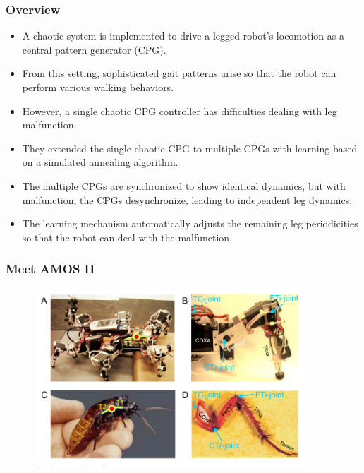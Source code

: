 \documentclass{beamer}
\begin{document}
\begin{frame}
\frametitle{Overview}
\begin{itemize}
\item A chaotic system is implemented to drive a legged robot's locomotion as a central pattern generator (CPG).
\item From this setting, sophisticated gait patterns arise so that the robot can perform various walking behaviors.
\item However, a single chaotic CPG controller has difficulties dealing with leg malfunction.
\item They extended the single chaotic CPG to multiple CPGs with learning based on a simulated annealing algorithm.
\item The multiple CPGs are synchronized to show identical dynamics, but with malfunction, the CPGs desynchronize, leading to independent leg dynamics.
\item The learning mechanism automatically adjusts the remaining leg periodicities so that the robot can deal with the malfunction.
\end{itemize}
\end{frame}

\begin{frame}
\frametitle{Meet AMOS II}
\begin{figure}
\center
\includegraphics[width=0.9\textwidth]{figs/AMOSII-cockroach.pdf}
\end{figure}
\end{frame}
\end{document}
